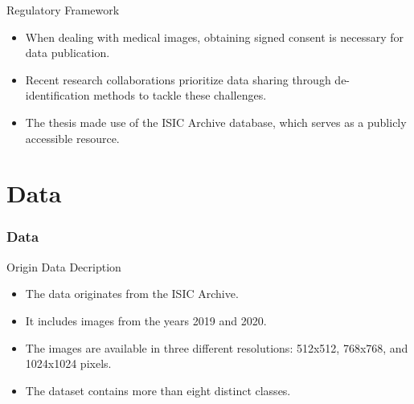 \documentclass[dvipsnames,mathserif]{beamer}
\begin{document}
{    \begin{frame}

      \large Regulatory Framework
      \vspace{0.25cm}

      \footnotesize

      \begin{itemize}
        \item When dealing with medical images, obtaining signed consent is
          necessary for data publication.
        \item Recent research collaborations prioritize data sharing through
          de-identification methods to tackle these challenges.
        \item The thesis made use of the ISIC Archive database, which serves as
          a publicly accessible resource.
      \end{itemize}


    \end{frame}



    \section{Data}

    \begin{frame}
      \frametitle{Data}
    \end{frame}

    \begin{frame}

      \large Origin Data Decription
      \vspace{0.25cm}

      \footnotesize

      \begin{itemize}
        \item The data originates from the ISIC Archive.
        \item It includes images from the years 2019 and 2020.
        \item The images are available in three different resolutions: 512x512,
          768x768, and 1024x1024 pixels.
        \item The dataset contains more than eight distinct classes.
      \end{itemize}

    \end{frame}


    \begin{frame}


\end{frame}}
\end{document}

